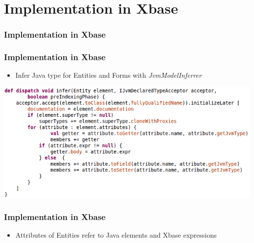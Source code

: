 \def \xbaseImpl {Implementation in Xbase}
\section[Xbase]{\xbaseImpl}

\begin{frame}
  \frametitle{\xbaseImpl}
  \tableofcontents[currentsection]
\end{frame}
  
\begin{frame}[fragile]
  \frametitle{\xbaseImpl}
  \begin{itemize}
    \item Infer Java type for Entities and Forms with
    \emph{JvmModelInferrer}
  \end{itemize}
  \pause
  \includegraphics[width=1.1\textwidth]{img/xbase-infer.png}
\end{frame}    

\begin{frame}
  \frametitle{\xbaseImpl}
  \begin{itemize}
    \item Attributes of Entities refer to Java elements and Xbase expressions
   \end{itemize}
  \begin{footnotesize}
  
  \end{footnotesize}
\end{frame}
  
